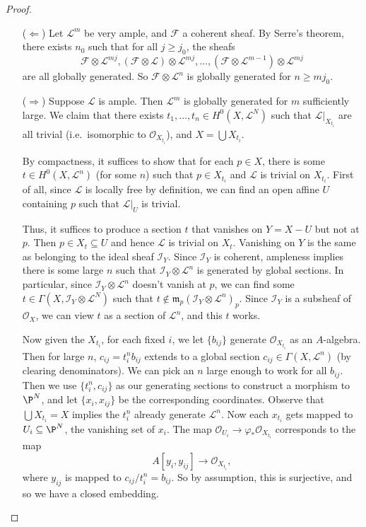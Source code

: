 \documentclass[a4paper]{article}
\begin{document}
\begin{proof}\leavevmode
  \begin{itemize}
    \item[($\Leftarrow$)] Let $\mathcal{L}^m$ be very ample, and $\mathcal{F}$ a coherent sheaf. By Serre's theorem, there exists $n_0$ such that for all $j \geq j_0$, the sheafs
      \[
        \mathcal{F} \otimes \mathcal{L}^{mj}, (\mathcal{F} \otimes \mathcal{L}) \otimes \mathcal{L}^{mj}, \ldots, (\mathcal{F} \otimes \mathcal{L}^{m - 1}) \otimes \mathcal{L}^{mj}
      \]
      are all globally generated. So $\mathcal{F} \otimes \mathcal{L}^n$ is globally generated for $n \geq mj_0$.
    \item[($\Rightarrow$)] Suppose $\mathcal{L}$ is ample. Then $\mathcal{L}^m$ is globally generated for $m$ sufficiently large. We claim that there exists $t_1, \ldots, t_n \in H^0(X, \mathcal{L}^N)$ such that $\mathcal{L}|_{X_{t_i}}$ are all trivial (i.e.\ isomorphic to $\mathcal{O}_{X_{t_i}}$), and $X = \bigcup X_{t_i}$.

      By compactness, it suffices to show that for each $p \in X$, there is some $t \in H^0(X, \mathcal{L}^n)$ (for some $n$) such that $p \in X_{t_i}$ and $\mathcal{L}$ is trivial on $X_{t_i}$. First of all, since $\mathcal{L}$ is locally free by definition, we can find an open affine $U$ containing $p$ such that $\mathcal{L}|_U$ is trivial.

      Thus, it suffices to produce a section $t$ that vanishes on $Y = X - U$ but not at $p$. Then $p \in X_t \subseteq U$ and hence $\mathcal{L}$ is trivial on $X_t$. Vanishing on $Y$ is the same as belonging to the ideal sheaf $\mathcal{I}_Y$. Since $\mathcal{I}_Y$ is coherent, ampleness implies there is some large $n$ such that $\mathcal{I}_Y \otimes \mathcal{L}^n$ is generated by global sections. In particular, since $\mathcal{I}_Y \otimes \mathcal{L}^n$ doesn't vanish at $p$, we can find some $t \in \Gamma(X, \mathcal{I}_Y \otimes \mathcal{L}^N)$ such that $t \not \in \mathfrak{m}_p (\mathcal{I}_Y \otimes \mathcal{L}^n)_p$. Since $\mathcal{I}_Y$ is a subsheaf of $\mathcal{O}_X$, we can view $t$ as a section of $\mathcal{L}^n$, and this $t$ works.

      Now given the $X_{t_i}$, for each fixed $i$, we let $\{b_{ij}\}$ generate $\mathcal{O}_{X_{t_i}}$ as an $A$-algebra. Then for large $n$, $c_{ij} = t_i^n b_{ij}$ extends to a global section $c_{ij} \in \Gamma(X, \mathcal{L}^n)$ (by clearing denominators). We can pick an $n$ large enough to work for all $b_{ij}$. Then we use $\{t_i^n, c_{ij}\}$ as our generating sections to construct a morphism to $\P^N$, and let $\{x_i, x_{ij}\}$ be the corresponding coordinates. Observe that $\bigcup X_{t_i} = X$ implies the $t_i^n$ already generate $\mathcal{L}^n$. Now each $x_{t_i}$ gets mapped to $U_i \subseteq \P^N$, the vanishing set of $x_i$. The map $\mathcal{O}_{U_i} \to \varphi_* \mathcal{O}_{X_{t_i}}$ corresponds to the map
      \[
        A[y_i, y_{ij}] \to \mathcal{O}_{X_{t_i}},
      \]
      where $y_{ij}$ is mapped to $c_{ij}/t_i^n = b_{ij}$. So by assumption, this is surjective, and so we have a closed embedding.\qedhere
  \end{itemize}
\end{proof}
\end{document}
